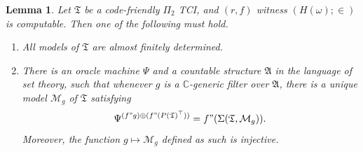 \documentclass[12pt, twoside]{memoir}
\numberwithin{equation}{section}
\newtheorem{lem}[thm]{Lemma}
\theoremstyle{definition}
\theoremstyle{remark}
\theoremstyle{definition}
\theoremstyle{definition}
\theoremstyle{definition}
\theoremstyle{remark}
\begin{document}
\begin{lem}\label{ctblegeneric}
Let $\mathfrak{T}$ be a code-friendly $\Pi_2$ TCI, and $(r, f)$ witness $(H(\omega); \in)$ is computable. Then one of the following must hold.
\begin{enumerate}[label=(\arabic*)]
    \item All models of $\mathfrak{T}$ are almost finitely determined.
    \item\label{3782} There is an oracle machine $\Psi$ and a countable structure $\mathfrak{A}$ in the language of set theory, such that whenever $g$ is a $\mathbb{C}$-generic filter over $\mathfrak{A}$, there is a unique model $\mathcal{M}_g$ of $\mathfrak{T}$ satisfying 
    \begin{equation*}
        \Psi^{(f" g) \oplus (f" (P(\mathfrak{T})^{\top}))} = f" (\Sigma(\mathfrak{T}, \mathcal{M}_g)) \text{.}
    \end{equation*}
    Moreover, the function $g \mapsto \mathcal{M}_g$ defined as such is injective.
\end{enumerate}
\end{lem}
\end{document}
